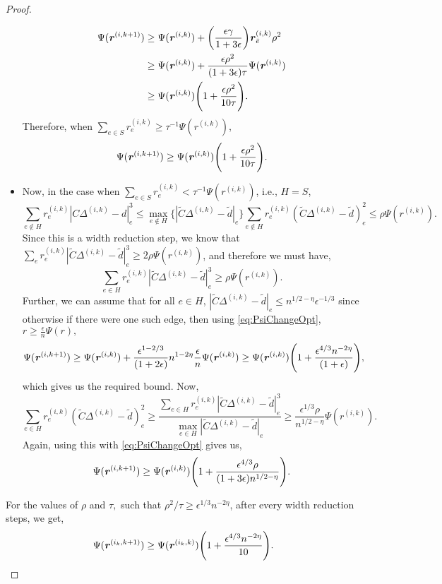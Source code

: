 \documentclass[11pt]{article}
\let\originalleft\left
\let\originalright\right
\renewcommand{\left}{\mathopen{}\mathclose\bgroup\originalleft}
\renewcommand{\right}{\aftergroup\egroup\originalright}
\newcommand\dd{\boldsymbol{\mathit{d}}}
\newcommand\rr{\boldsymbol{\mathit{r}}}
\newcommand\CC{\boldsymbol{\mathit{C}}}
\newcommand{\wt}{\widetilde}
\begin{document}
\begin{proof}
\begin{itemize}
\begin{align*}
\Psi(\rr^{(i,k+1)})&\geq \Psi(\rr^{(i,k)}) +   \left(\frac{\epsilon\gamma}{1+3\epsilon} \right)\rr_{\bar{e}}^{(i,k)} \rho^2\\
&\geq \Psi(\rr^{(i,k)}) + \frac{\epsilon \rho^2}{(1+3\epsilon) \tau}\Psi(\rr^{(i,k)}) \\
&\geq \Psi(\rr^{(i,k)}) \left(1 + \frac{\epsilon \rho^2}{10 \tau}\right).
\end{align*}
Therefore, when $\sum_{e\in S}\rr_e^{(i,k)}\geq \tau^{-1}\Psi(\rr^{(i,k)})$,
\begin{equation*}
    \Psi(\rr^{(i,k+1)})\geq\Psi(\rr^{(i,k)}) \left(1 + \frac{\epsilon \rho^2}{10 \tau}\right).
\end{equation*}
\item  Now, in the case when $\sum_{e\in S} \rr^{(i,k)}_e < \tau^{-1}\Psi(\rr^{(i,k)})$, i.e., $H = S$,
\[
\sum_{e \notin H}\rr^{(i,k)}_e|\CC\Delta^{(i,k)}-\dd|_e^3 \leq \max_{e\notin H}\{|\wt{\CC} \Delta^{(i,k)} - \wt{\dd}|_e\}\sum_{e \notin H}\rr^{(i,k)}_e (\wt{\CC} \Delta^{(i,k)} - \wt{\dd})_e^2 \leq \rho\Psi(\rr^{(i,k)}).
\]
Since this is a width reduction step, we know that $\sum_{e }\rr^{(i,k)}_e|\wt{\CC} \Delta^{(i,k)} - \wt{\dd}|_e^3 \geq 2 \rho \Psi(\rr^{(i,k)})$, and therefore we must have,
\[
\sum_{e\in H }\rr^{(i,k)}_e|\wt{\CC} \Delta^{(i,k)} - \wt{\dd}|_e^3 \geq \rho\Psi(\rr^{(i,k)}).
\]
Further, we can assume that for all $e\in H$, $|\wt{\CC} \Delta^{(i,k)} - \wt{\dd}|_e \leq n^{1/2-\eta}\epsilon^{-1/3}$ since otherwise if there were one such edge, then using \eqref{eq:PsiChangeOpt},  $\rr\geq \frac{\epsilon}{n}\Psi(\rr),$ 
\[
\Psi(\rr^{(i,k+1)})\geq \Psi(\rr^{(i,k)}) +  \frac{\epsilon^{1-2/3}}{(1+2\epsilon)} n^{1-2\eta}\frac{\epsilon}{n}\Psi(\rr^{(i,k)}) \geq \Psi(\rr^{(i,k)})\left(1 + \frac{\epsilon^{4/3} n^{-2\eta}}{(1+\epsilon)} \right),
\]
which gives us the required bound.
 Now, 
\[
\sum_{e\in H} \rr^{(i,k)}_e (\wt{\CC} \Delta^{(i,k)} - \wt{\dd})_e^2 \geq \frac{\sum_{e\in H}\rr^{(i,k)}_e |\wt{\CC} \Delta^{(i,k)} - \wt{\dd}|_e^3}{\max_{e\in H} |\wt{\CC} \Delta^{(i,k)} - \wt{\dd}|_e} \geq \frac{\epsilon^{1/3}\rho}{n^{1/2-\eta}} \Psi(\rr^{(i,k)}).
\]
Again, using this with \eqref{eq:PsiChangeOpt} gives us, 
\[
\Psi(\rr^{(i,k+1)}) \geq \Psi(\rr^{(i,k)}) \left(1 + \frac{\epsilon^{4/3} \rho}{(1+3\epsilon)n^{1/2-\eta}}\right).
\]
\end{itemize}
For the values of $\rho $ and $\tau,$ such that $\rho^2/\tau \geq \epsilon^{1/3} n^{-2\eta}$, after every width reduction steps, we get,
\[
\Psi(\rr^{(i_k,k+1)})\geq \Psi(\rr^{(i_k,k)})\left(1 + \frac{\epsilon^{4/3} n^{-2\eta}}{10}\right).
\]


\end{proof}
\end{document}
